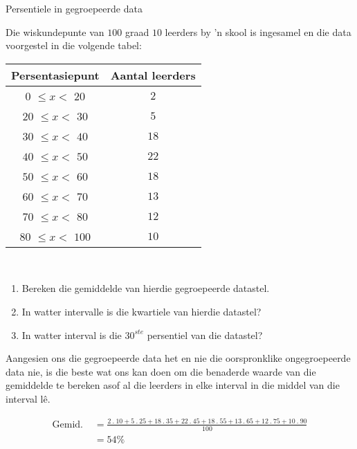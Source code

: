 \begin{wex}{Persentiele in gegroepeerde data}
{Die wiskundepunte van $100$ graad $10$ leerders by ’n skool is ingesamel en die data voorgestel in die volgende tabel:\\
    \begin{center}
      \begin{tabular}{|c|c|}  \hline
       
       \textbf{Persentasiepunt} & \textbf{Aantal leerders} \\  \hline

         $0$  $ \leq x < $   $20$ &  $2$ \\ \hline
        $20$  $ \leq x < $   $30$ &  $5$ \\\hline
        $30$  $ \leq x < $   $40$ & $18$ \\\hline
        $40$  $ \leq x < $   $50$ & $22$ \\\hline
        $50$  $ \leq x < $   $60$ & $18$ \\\hline
        $60$  $ \leq x < $   $70$ & $13$ \\\hline
        $70$  $ \leq x < $   $80$ & $12$ \\\hline
        $80$  $ \leq x < $  $100$ & $10$ \\\hline
   
      \end{tabular}
    \end{center}
\vspace {8pt}\\
    \begin{enumerate}[noitemsep, label=\textbf{\arabic*}.]
    \item Bereken die gemiddelde van hierdie gegroepeerde datastel.
    \item In watter intervalle is die kwartiele van hierdie datastel?
    \item In watter interval is die $30^{ste}$ persentiel van die datastel?
    \end{enumerate}
}{

  Aangesien ons die gegroepeerde data het en nie die oorspronklike ongegroepeerde data nie, is die beste wat ons kan doen om die benaderde waarde van die gemiddelde te bereken asof al die leerders in elke interval in die middel van die interval l\^e.

  \begin{align*}
 \mbox{Gemid. } &=  \frac{
         2\:.\:10
      +  5\:.\:25
      + 18\:.\:35
      + 22\:.\:45
      + 18\:.\:55
      + 13\:.\:65
      + 12\:.\:75
      + 10\:.\:90
    }{100}\\
    &= 54\%
  \end{align*}

}
\end{wex}
